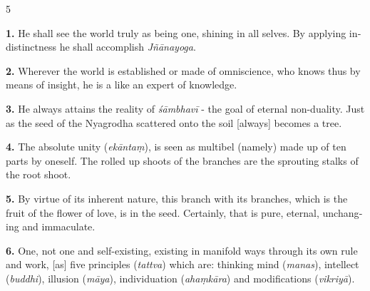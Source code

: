\begin{otherlanguage}{english}
\begin{tlate}
    \end{tlate}
5%
    \begin{tlate}
  \textbf{1.} He shall see the world truly as being one, shining in all selves.
            By applying indistinctness he shall accomplish \textit{Jñānayoga}. \\
    \end{tlate}
    \begin{tlate}
      \textbf{2.} Wherever the world is established or made of omniscience,
            who knows thus by means of insight, he is a like an expert of knowledge. \\
    \end{tlate}
    \begin{tlate}
       \textbf{3.} He always attains the reality of \textit{śāmbhavī} - the goal of eternal non-duality.
            Just as the seed of the Nyagrodha scattered onto the soil [always] becomes a tree. \\
    \end{tlate}
    \begin{tlate}
        \textbf{4.} The absolute unity (\textit{ekāntaṃ}), is seen as multibel (namely) made up of ten parts by oneself.
            The rolled up shoots of the branches are the sprouting stalks of the root shoot. \\
          \end{tlate}
    \begin{tlate}
            \textbf{5.} By virtue of its inherent nature, this branch with its branches, which is the fruit of the flower of love, is in the seed.
            Certainly, that is pure, eternal, unchanging and immaculate. \\
          \end{tlate}
   \begin{tlate}
            \textbf{6.} One, not one and self-existing, existing in manifold ways through its own rule and work,
            [as] five principles (\textit{tattva}) which are: thinking mind (\textit{manas}), intellect (\textit{buddhi}), illusion (\textit{māya}), individuation (\textit{ahaṃkāra}) and modifications (\textit{vikriyā}). \\       
   \end{tlate}
  \begin{tlate}

\end{tlate}
\end{otherlanguage}
